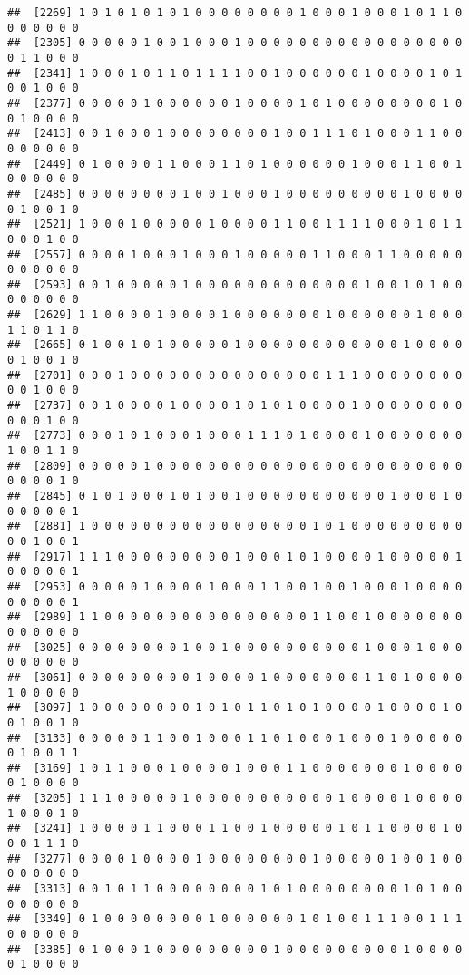 \documentclass[
]{article}
\begin{document}
\begin{verbatim}
##  [2269] 1 0 1 0 1 0 1 0 1 0 0 0 0 0 0 0 0 1 0 0 0 1 0 0 0 1 0 1 1 0 0 0 0 0 0 0
##  [2305] 0 0 0 0 0 1 0 0 1 0 0 0 1 0 0 0 0 0 0 0 0 0 0 0 0 0 0 0 0 0 0 1 1 0 0 0
##  [2341] 1 0 0 0 1 0 1 1 0 1 1 1 1 0 0 1 0 0 0 0 0 0 1 0 0 0 0 1 0 1 0 0 1 0 0 0
##  [2377] 0 0 0 0 0 1 0 0 0 0 0 0 1 0 0 0 0 1 0 1 0 0 0 0 0 0 0 0 1 0 0 1 0 0 0 0
##  [2413] 0 0 1 0 0 0 1 0 0 0 0 0 0 0 0 1 0 0 1 1 1 0 1 0 0 0 1 1 0 0 0 0 0 0 0 0
##  [2449] 0 1 0 0 0 0 1 1 0 0 0 1 1 0 1 0 0 0 0 0 0 1 0 0 0 1 1 0 0 1 0 0 0 0 0 0
##  [2485] 0 0 0 0 0 0 0 0 1 0 0 1 0 0 0 1 0 0 0 0 0 0 0 0 0 1 0 0 0 0 0 1 0 0 1 0
##  [2521] 1 0 0 0 1 0 0 0 0 0 1 0 0 0 0 1 1 0 0 1 1 1 1 0 0 0 1 0 1 1 0 0 0 1 0 0
##  [2557] 0 0 0 0 1 0 0 0 1 0 0 0 1 0 0 0 0 0 1 1 0 0 0 1 1 0 0 0 0 0 0 0 0 0 0 0
##  [2593] 0 0 1 0 0 0 0 0 1 0 0 0 0 0 0 0 0 0 0 0 0 0 1 0 0 1 0 1 0 0 0 0 0 0 0 0
##  [2629] 1 1 0 0 0 0 1 0 0 0 0 1 0 0 0 0 0 0 0 1 0 0 0 0 0 0 1 0 0 0 1 1 0 1 1 0
##  [2665] 0 1 0 0 1 0 1 0 0 0 0 0 1 0 0 0 0 0 0 0 0 0 0 0 0 1 0 0 0 0 0 1 0 0 1 0
##  [2701] 0 0 0 1 0 0 0 0 0 0 0 0 0 0 0 0 0 0 0 1 1 1 0 0 0 0 0 0 0 0 0 0 1 0 0 0
##  [2737] 0 0 1 0 0 0 0 1 0 0 0 0 1 0 1 0 1 0 0 0 0 1 0 0 0 0 0 0 0 0 0 0 0 1 0 0
##  [2773] 0 0 0 1 0 1 0 0 0 1 0 0 0 1 1 1 0 1 0 0 0 0 1 0 0 0 0 0 0 0 1 0 0 1 1 0
##  [2809] 0 0 0 0 0 1 0 0 0 0 0 0 0 0 0 0 0 0 0 0 0 0 0 0 0 0 0 0 0 0 0 0 0 0 1 0
##  [2845] 0 1 0 1 0 0 0 1 0 1 0 0 1 0 0 0 0 0 0 0 0 0 0 0 1 0 0 0 1 0 0 0 0 0 0 1
##  [2881] 1 0 0 0 0 0 0 0 0 0 0 0 0 0 0 0 0 0 1 0 1 0 0 0 0 0 0 0 0 0 0 0 1 0 0 1
##  [2917] 1 1 1 0 0 0 0 0 0 0 0 0 1 0 0 0 1 0 1 0 0 0 0 1 0 0 0 0 0 1 0 0 0 0 0 1
##  [2953] 0 0 0 0 0 1 0 0 0 0 1 0 0 0 1 1 0 0 1 0 0 1 0 0 0 1 0 0 0 0 0 0 0 0 0 1
##  [2989] 1 1 0 0 0 0 0 0 0 0 0 0 0 0 0 0 0 0 1 1 0 0 1 0 0 0 0 0 0 0 0 0 0 0 0 0
##  [3025] 0 0 0 0 0 0 0 0 1 0 0 1 0 0 0 0 0 0 0 0 0 0 1 0 0 0 1 0 0 0 0 0 0 0 0 0
##  [3061] 0 0 0 0 0 0 0 0 0 1 0 0 0 0 1 0 0 0 0 0 0 0 1 1 0 1 0 0 0 0 1 0 0 0 0 0
##  [3097] 1 0 0 0 0 0 0 0 0 1 0 1 0 1 1 0 1 0 1 0 0 0 0 1 0 0 0 0 1 0 0 1 0 0 1 0
##  [3133] 0 0 0 0 0 1 1 0 0 1 0 0 0 1 1 0 1 0 0 0 1 0 0 0 1 0 0 0 0 0 0 1 0 0 1 1
##  [3169] 1 0 1 1 0 0 0 1 0 0 0 0 1 0 0 0 1 1 0 0 0 0 0 0 0 1 0 0 0 0 0 1 0 0 0 0
##  [3205] 1 1 1 0 0 0 0 0 1 0 0 0 0 0 0 0 0 0 0 0 1 0 0 0 0 1 0 0 0 0 1 0 0 0 1 0
##  [3241] 1 0 0 0 0 1 1 0 0 0 1 1 0 0 1 0 0 0 0 0 1 0 1 1 0 0 0 0 1 0 0 0 1 1 1 0
##  [3277] 0 0 0 0 1 0 0 0 0 1 0 0 0 0 0 0 0 0 1 0 0 0 0 0 1 0 0 1 0 0 0 0 0 0 0 0
##  [3313] 0 0 1 0 1 1 0 0 0 0 0 0 0 0 1 0 1 0 0 0 0 0 0 0 0 1 0 1 0 0 0 0 0 0 0 0
##  [3349] 0 1 0 0 0 0 0 0 0 0 1 0 0 0 0 0 0 1 0 1 0 0 1 1 1 0 0 1 1 1 0 0 0 0 0 0
##  [3385] 0 1 0 0 0 1 0 0 0 0 0 0 0 0 0 1 0 0 0 0 0 0 0 0 0 1 0 0 0 0 0 1 0 0 0 0

\end{verbatim}
\end{document}
